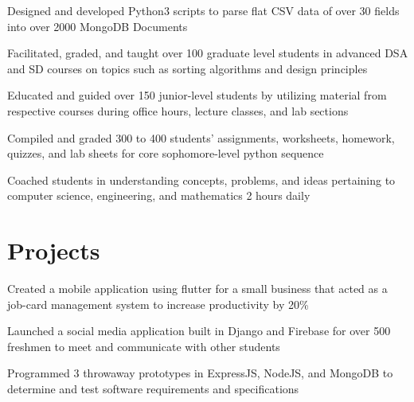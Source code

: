 \documentclass[]{two-column}
\begin{document}
\begin{minipage}[t]{0.66\textwidth}
\begin{tightemize}
\vspace{1pt}
\item Designed and developed Python3 scripts to parse flat CSV data of over 30 fields into over 2000 MongoDB Documents

\end{tightemize}
\sectionsep

\vspace{1pt}
\begin{tightemize}
\item Facilitated, graded, and taught over 100 graduate level students in advanced DSA and SD courses on topics such as sorting algorithms and design principles 
\vspace{1pt}
\item Educated and guided over 150 junior-level students by utilizing material from respective courses during office hours, lecture classes, and lab sections
\vspace{1pt}
\item Compiled and graded 300 to 400 students' assignments, worksheets, homework, quizzes, and lab sheets for core sophomore-level python sequence
\vspace{1pt}
\item Coached students in understanding concepts, problems, and ideas pertaining to computer science, engineering, and mathematics 2 hours daily
\end{tightemize}
\sectionsep
\vspace{-5pt}


\section{Projects}
\begin{tightemize}
\vspace{1pt}
\item Created a mobile application using flutter for a small business that acted as a job-card management system to increase productivity by 20\%
\end{tightemize}
\sectionsep
{}
\vspace{1pt}
\begin{tightemize}
\item Launched a social media application built in Django and Firebase for over 500 freshmen to meet and communicate with other students
\vspace{1pt}
\item Programmed 3 throwaway prototypes in ExpressJS, NodeJS, and MongoDB to determine and test software requirements and specifications
\end{tightemize}

\end{minipage}
\end{document}

